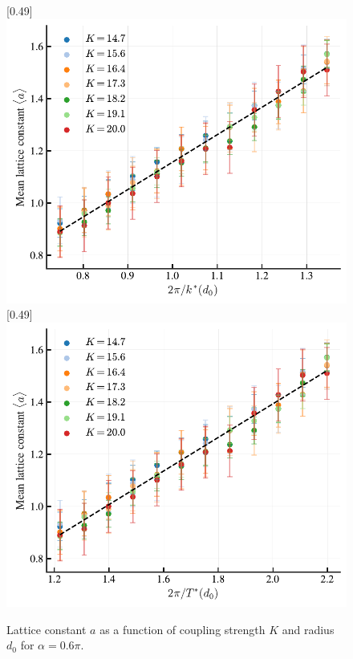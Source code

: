 \documentclass{article}
\begin{document}
\begin{figure}[H]
    \centering
    [0.49\linewidth]{
        \includegraphics[width=\linewidth]{./figs/lattice_constant_vs_kstar.pdf}
    }
    \hfill
    [0.49\linewidth]{
        \includegraphics[width=\linewidth]{./figs/lattice_constant_vs_kdiff.pdf}
    }
    \caption{
        Lattice constant $a$ as a function of coupling strength $K$ and radius $d_0$ for $\alpha=0.6\pi$.
    }
\end{figure}
\end{document}
